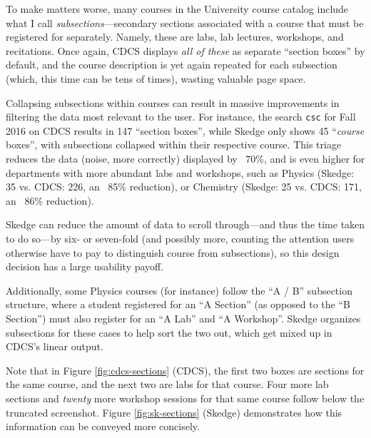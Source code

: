 To make matters worse, many courses in the University course catalog include what I call \emph{subsections}---secondary sections associated with a course that must be registered for separately. Namely, these are labs, lab lectures, workshops, and recitations. Once again, CDCS displays \emph{all of these} as separate ``section boxes'' by default, and the course description is yet again repeated for each subsection (which, this time can be tens of times), wasting valuable page space.

Collapsing subsections within courses can result in massive improvements in filtering the data most relevant to the user. For instance, the search {\tt csc} for Fall 2016 on CDCS results in 147 ``section boxes'', while Skedge only shows 45 ``\emph{course} boxes'', with subsections collapsed within their respective course. This triage reduces the data (noise, more correctly) displayed by ~70\%, and is even higher for departments with more abundant labs and workshops, such as Physics (Skedge: 35 vs. CDCS: 226, an ~85\% reduction), or Chemistry (Skedge: 25 vs. CDCS: 171, an ~86\% reduction).

Skedge can reduce the amount of data to scroll through---and thus the time taken to do so---by six- or seven-fold (and possibly more, counting the attention users otherwise have to pay to distinguish course from subsections), so this design decision has a large usability payoff.

Additionally, some Physics courses (for instance) follow the ``A / B'' subsection structure, where a student registered for an ``A Section'' (as opposed to the ``B Section'') must also register for an ``A Lab'' and ``A Workshop''. Skedge organizes subsections for these cases to help sort the two out, which get mixed up in CDCS's linear output.

Note that in Figure \ref{fig:cdcs-sections} (CDCS), the first two boxes are sections for the same course, and the next two are labs for that course. Four more lab sections and \emph{twenty} more workshop sessions for that same course follow below the truncated screenshot. Figure \ref{fig:sk-sections} (Skedge) demonstrates how this information can be conveyed more concisely.

